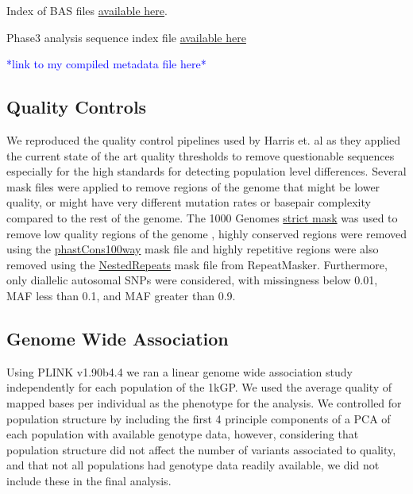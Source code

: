 \documentclass[9pt,lineno]{elife}
\newcommand{\todo}[1]{\textcolor{blue}{*#1*}}
\begin{document}
Index of BAS files \href{http://ftp.1000genomes.ebi.ac.uk/vol1/ftp/data_collections/1000_genomes_project/1000genomes.low_coverage.GRCh38DH.alignment.index}{available here}.

Phase3 analysis sequence index file  \href{http://ftp.1000genomes.ebi.ac.uk/vol1/ftp/phase3/20130502.phase3.analysis.sequence.index}{available here} 

\todo{link to my compiled metadata file here}

\subsection{Quality Controls}
We reproduced the quality control pipelines used by Harris et. al as they applied the current state of the art quality thresholds to remove questionable sequences especially for the high standards for detecting population level differences. 
Several mask files were applied to remove regions of the genome that might be lower quality, or might have very different mutation rates or basepair complexity compared to the rest of the genome. 
The  1000 Genomes \href{http://ftp.1000genomes.ebi.ac.uk/vol1/ftp/release/20130502/supporting/accessible_genome_masks/20141020.strict_mask.whole_genome.bed}{strict mask} was used to remove low quality regions of the genome , highly conserved regions were removed using the \href{http://hgdownload.cse.ucsc.edu/goldenPath/hg19/database/phastConsElements100way.txt.gz}{phastCons100way} mask file and highly repetitive regions were also removed using the \href{http://hgdownload.cse.ucsc.edu/goldenpath/hg19/database/nestedRepeats.txt.gz}{NestedRepeats} mask file from RepeatMasker. 
Furthermore, only diallelic autosomal SNPs were considered, with missingness below 0.01, MAF less than 0.1, and MAF greater than 0.9.

\subsection{Genome Wide Association}

Using PLINK v1.90b4.4 we ran a linear genome wide association study independently for each population of the 1kGP. We used the average quality of mapped bases per individual as the phenotype for the analysis. We controlled for population structure by including the first 4 principle components of a PCA of each population with available genotype data, however, considering that population structure did not affect the number of variants associated to quality, and that not all populations had genotype data readily available, we did not include these in the final analysis. 
\end{document}
